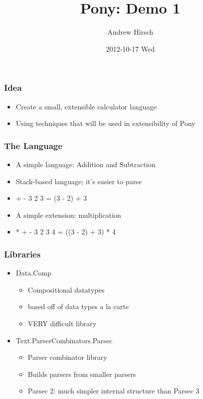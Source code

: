 \documentclass[bigger]{beamer}
\institute{GWU}
\title{Pony: Demo 1}
\author{Andrew Hirsch}
\date{2012-10-17 Wed}
\begin{document}
\maketitle


\begin{frame}
\frametitle{Idea}
\label{sec-1}



\begin{itemize}
\item Create a small, extensible calculator language
\item Using techniques that will be used in extensibility of Pony
\end{itemize}
\end{frame}
\begin{frame}
\frametitle{The Language}
\label{sec-2}



\begin{itemize}
\item A simple language: Addition and Subtraction
\item Stack-based language; it's easier to parse
\item + - 3 2 3 = (3 - 2) + 3
\end{itemize}
\pause

\begin{itemize}
\item A simple extension: multiplication
\item * + - 3 2 3 4 = ((3 - 2) + 3) * 4
\end{itemize}
\end{frame}
\begin{frame}
\frametitle{Libraries}
\label{sec-3}



\begin{itemize}
\item Data.Comp
\begin{itemize}
\item Compositional datatypes
\item based off of data types a la carte
\item VERY difficult library
\end{itemize}
\item Text.ParserCombinators.Parsec
\begin{itemize}
\item Parser combinator library
\item Builds parsers from smaller parsers
\item Parsec 2: much simpler internal structure than Parsec 3
\end{itemize}
\end{itemize}
\end{frame}
\end{document}
